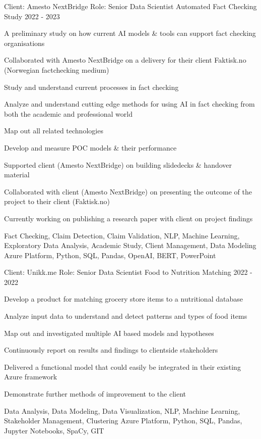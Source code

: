 \begin{cventries}
\cventry
{Client: Amesto NextBridge \newline Role: Senior Data Scientist} %
{Automated Fact Checking Study} %
{}%
{2022 - 2023} %
{ %
\begin{cvitems}
\item {A preliminary study on how current AI models \& tools can support fact checking organisations}
\item {Collaborated with Amesto NextBridge on a delivery for their client Faktisk.no (Norwegian factchecking medium)}
\item {Study and understand current processes in fact checking}
\item {Analyze and understand cutting edge methods for using AI in fact checking from both the academic and professional world}
\item {Map out all related technologies}
\item {Develop and measure POC models \& their performance}
\item {Supported client (Amesto NextBridge) on building slidedecks \& handover material}
\item {Collaborated with client (Amesto NextBridge) on presenting the outcome of the project to their client (Faktisk.no)}
\item {Currently working on publishing a research paper with client on project findings}
\end{cvitems}
\cventrykeywords
{Fact Checking, Claim Detection, Claim Validation, NLP, Machine Learning, Exploratory Data Analysis, Academic Study, Client Management, Data Modeling}
{Azure Platform, Python, SQL, Pandas, OpenAI, BERT, PowerPoint}
}

\cventry
{Client: Unikk.me \newline Role: Senior Data Scientist} %
{Food to Nutrition Matching} %
{}%
{2022 - 2022} %
{ %
\begin{cvitems}
\item {Develop a product for matching grocery store items to a nutritional database}
\item {Analyze input data to understand and detect patterns and types of food items}
\item {Map out and investigated multiple AI based models and hypotheses}
\item {Continuously report on results and findings to clientside stakeholders}
\item {Delivered a functional model that could easily be integrated in their existing Azure framework}
\item {Demonstrate further methods of improvement to the client}
\end{cvitems}
\cventrykeywords
{Data Analysis, Data Modeling, Data Visualization, NLP, Machine Learning, Stakeholder Management, Clustering}
{Azure Platform, Python, SQL, Pandas, Jupyter Notebooks, SpaCy, GIT}
}


\end{cventries}
